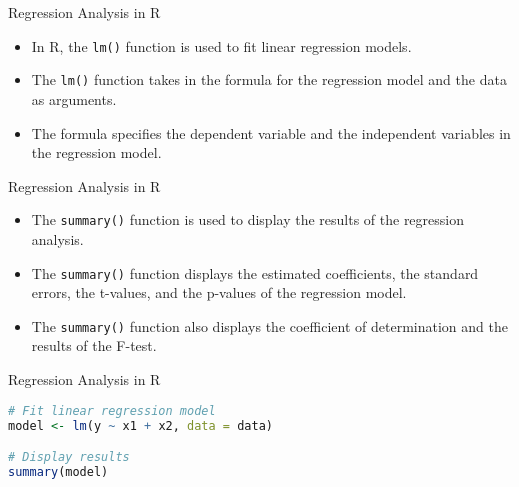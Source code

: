 \documentclass[serif, 9pt, aspectratio=32]{beamer}
\begin{document}
\begin{frame}{Regression Analysis in R}
    \begin{itemize}
        \setlength{\itemsep}{2em}
        \item In R, the \texttt{lm()} function is used to fit linear regression models.
        \item The \texttt{lm()} function takes in the formula for the regression model and the data as arguments.
        \item The formula specifies the dependent variable and the independent variables in the regression model.
    \end{itemize}
\end{frame}

\begin{frame}{Regression Analysis in R}
    \begin{itemize}
        \setlength{\itemsep}{2em}
        \item The \texttt{summary()} function is used to display the results of the regression analysis.
        \item The \texttt{summary()} function displays the estimated coefficients, the standard errors, the t-values, and the p-values of the regression model.
        \item The \texttt{summary()} function also displays the coefficient of determination and the results of the F-test.
    \end{itemize}
\end{frame}

\begin{frame}[fragile]{Regression Analysis in R}
    \begin{lstlisting}[language=R]
# Fit linear regression model
model <- lm(y ~ x1 + x2, data = data)

# Display results
summary(model)
    \end{lstlisting}
\end{frame}



\end{document}
